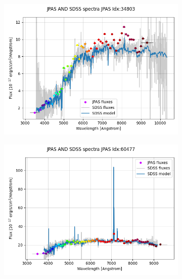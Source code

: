\documentclass{beamer}
\begin{document}
\begin{frame}
\begin{figure}
        \begin{subfigure}{0.3\linewidth}
            \centering
            \includegraphics[width=1.0\textwidth]{../../figs/spec/jpas_sdss_34803.png}
        \end{subfigure}
        \begin{subfigure}{0.3\linewidth}
            \centering
            \includegraphics[width=1.0\textwidth]{../../figs/spec/jpas_sdss_60477.png}
        \end{subfigure}
        \begin{subfigure}{0.3\linewidth}
            \centering

\end{subfigure}
\end{figure}
\end{frame}
\end{document}
